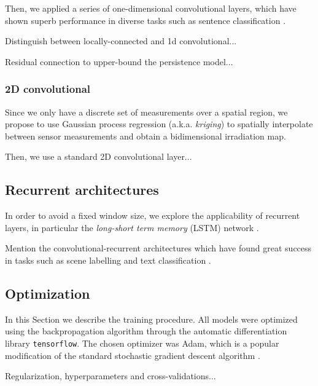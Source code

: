 \documentclass[preprints,article,accept,moreauthors,pdftex]{template/mdpi}
\begin{document}
Then, we applied a series of one-dimensional convolutional layers, which have shown superb performance in diverse tasks such as sentence classification \cite{kim2014convolutional}.

Distinguish between locally-connected and 1d convolutional...

Residual connection to upper-bound the persistence model...

\subsubsection{2D convolutional}

Since we only have a discrete set of measurements over a spatial region, we propose to use Gaussian process regression  \cite{rasmussen2003gaussian} (a.k.a. \emph{kriging}) to spatially interpolate between sensor measurements and obtain a bidimensional irradiation map.

Then, we use a standard 2D convolutional layer...



\subsection{Recurrent architectures}

In order to avoid a fixed window size, we explore the applicability of recurrent layers, in particular the \emph{long-short term memory} (LSTM) network \cite{gers1999learning}.

Mention the convolutional-recurrent architectures which have found great success in tasks such as scene labelling \cite{pinheiro2014recurrent} and text classification \cite{lai2015recurrent}.

\subsection{Optimization}

In this Section we describe the training procedure. All models were optimized using the backpropagation algorithm \cite{Rumelhart:1986:LIR:104279.104293} through the automatic differentiation library \texttt{tensorflow}. The chosen optimizer was Adam, which is a popular modification of the standard stochastic gradient descent algorithm \cite{kingma2014adam}.

Regularization, hyperparameters and cross-validations...

\end{document}
